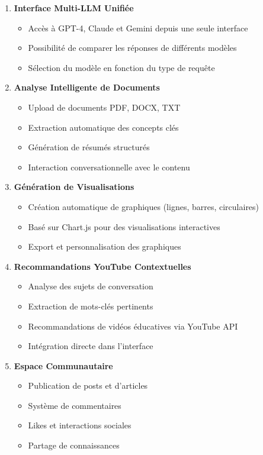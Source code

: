 \begin{enumerate}
    \item \textbf{Interface Multi-LLM Unifiée}
    \begin{itemize}
        \item Accès à GPT-4, Claude et Gemini depuis une seule interface
        \item Possibilité de comparer les réponses de différents modèles
        \item Sélection du modèle en fonction du type de requête
    \end{itemize}
    
    \item \textbf{Analyse Intelligente de Documents}
    \begin{itemize}
        \item Upload de documents PDF, DOCX, TXT
        \item Extraction automatique des concepts clés
        \item Génération de résumés structurés
        \item Interaction conversationnelle avec le contenu
    \end{itemize}
    
    \item \textbf{Génération de Visualisations}
    \begin{itemize}
        \item Création automatique de graphiques (lignes, barres, circulaires)
        \item Basé sur Chart.js pour des visualisations interactives
        \item Export et personnalisation des graphiques
    \end{itemize}
    
    \item \textbf{Recommandations YouTube Contextuelles}
    \begin{itemize}
        \item Analyse des sujets de conversation
        \item Extraction de mots-clés pertinents
        \item Recommandations de vidéos éducatives via YouTube API
        \item Intégration directe dans l'interface
    \end{itemize}
    
    \item \textbf{Espace Communautaire}
    \begin{itemize}
        \item Publication de posts et d'articles
        \item Système de commentaires
        \item Likes et interactions sociales
        \item Partage de connaissances
    \end{itemize}
    

\end{enumerate}
